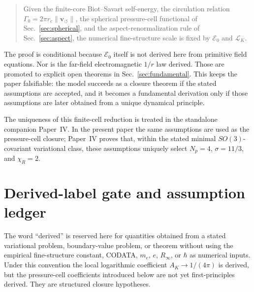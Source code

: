\documentclass[11pt]{article}
\newcommand{\vnorm}{\lVert\mathbf{v}_{\!\boldsymbol{\circlearrowleft}}\rVert}
\newcommand{\rc}{r_c}
\newcommand{\LK}{\mathcal L_K}
\newcommand{\Ezero}{\mathcal E_0}
\begin{document}
\begin{quote}
Given the finite-core Biot--Savart self-energy, the circulation relation
\(\Gamma_0=2\pi \rc\vnorm\), the spherical pressure-cell functional of
Sec.~\ref{sec:spherical}, and the aspect-renormalization rule of Sec.~\ref{sec:aspect},
the numerical fine-structure scale is fixed by \(\Ezero\) and \(\LK\).
\end{quote}

The proof is conditional because \(\Ezero\) itself is not derived here from primitive field
equations.  Nor is the far-field electromagnetic \(1/r\) law derived.  Those are promoted to
explicit open theorems in Sec.~\ref{sec:fundamental}.  This keeps the paper falsifiable:
the model succeeds as a closure theorem if the stated assumptions are accepted, and it becomes
a fundamental derivation only if those assumptions are later obtained from a unique dynamical
principle.



The uniqueness of this finite-cell reduction is treated in the standalone
companion Paper~IV.  In the present paper the same assumptions are used as the
pressure-cell closure; Paper~IV proves that, within the stated minimal
\(SO(3)\)-covariant variational class, these assumptions uniquely select
\(N_p=4\), \(\sigma=11/3\), and \(\chi_R=2\).

\section{Derived-label gate and assumption ledger}
\label{sec:derived-label-gate}

The word ``derived'' is reserved here for quantities obtained from a stated
variational problem, boundary-value problem, or theorem without using the
empirical fine-structure constant, CODATA, \(m_e\), \(e\), \(R_\infty\), or
\(\hbar\) as numerical inputs.  Under this convention the local logarithmic
coefficient \(A_K\to1/(4\pi)\) is derived, but the pressure-cell coefficients
introduced below are not yet first-principles derived.  They are structured
closure hypotheses.
\end{document}
